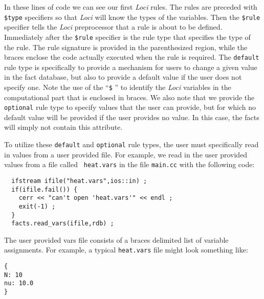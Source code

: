 \documentclass[10pt,epsf]{book}
\begin{document}
In these lines of code we can see our first {\it Loci} rules.  The rules are
preceded with {\tt \$type} specifiers so that {\it Loci} will know the types
of the variables.  Then the {\tt \$rule} specifier tells the {\it Loci}
preprocessor that a rule is about to be defined.  Immediately after
the {\tt \$rule} specifier is the rule type that specifies the type of
the rule.  The rule signature is provided in the parenthesized region,
while the braces enclose the code actually executed when the rule is
required.  The {\tt default} rule type is specifically to provide a
mechanism for users to change a given value in the fact database, but
also to provide a default value if the user does not specify one.
Note the use of the ``{\tt \$} '' to identify the {\it Loci} variables in
the computational part that is enclosed in braces.  We also note that
we provide the {\tt optional} rule type to specify values that the
user can provide, but for which no default value will be provided if
the user provides no value.  In this case, the facts will simply not
contain this attribute. 

To utilize these {\tt default} and {\tt optional} rule types, the user
must specifically read in values from a user provided file.  For
example, we read in the user provided values from a file called {\tt
  heat.vars} in the file {\tt main.cc} with the following code:

\begin{verbatim}
  ifstream ifile("heat.vars",ios::in) ;
  if(ifile.fail()) {
    cerr << "can't open 'heat.vars'" << endl ;
    exit(-1) ;
  }
  facts.read_vars(ifile,rdb) ;
\end{verbatim}

The user provided vars file consists of a braces delimited list of
variable assignments.  For example, a typical {\tt heat.vars} file
might look something like:
\begin{verbatim}
{
N: 10
nu: 10.0
}
\end{verbatim}
\end{document}
